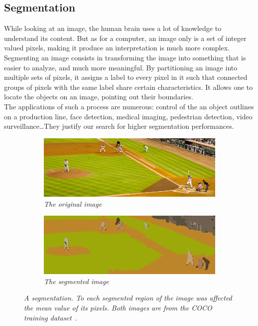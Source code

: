 \documentclass{article}
\begin{document}
    \subsection{Segmentation}
        While looking at an image, the human brain uses a lot of knowledge to understand its content. But as for a computer, an image only is a set of integer valued pixels, making it produce an interpretation is much more complex. Segmenting an image consists in transforming the image into something that is easier to analyze, and much more meaningful. By partitioning an image into multiple sets of pixels, it assigns a label to every pixel in it such that connected groups of pixels with the same label share certain characteristics. It allows one to locate the objects on an image, pointing out their boundaries.\\
        The applications of such a process are numerous: control of the an object outlines on a production line, face detection, medical imaging, pedestrian detection, video surveillance\ldots They justify our search for higher segmentation performances.

        \begin{figure}[!ht]
        \centering
        \begin{subfigure}{.49\linewidth}
            \centering
            \includegraphics[width=0.9\linewidth]{pics/img_segm1.jpg}
            \caption{\textit{The original image}}
        \end{subfigure}
        \begin{subfigure}{.49\linewidth}
            \centering
            \includegraphics[width=0.9\linewidth]{pics/img_segm2.png}
            \caption{\textit{The segmented image}}
        \end{subfigure}
            \caption{\textit{A segmentation. To each segmented region of the image was affected the mean value of its pixels. Both images are from the COCO training dataset~\cite{microsoft2014}.}}
            \label{fig:segm}
        \end{figure}
\end{document}
